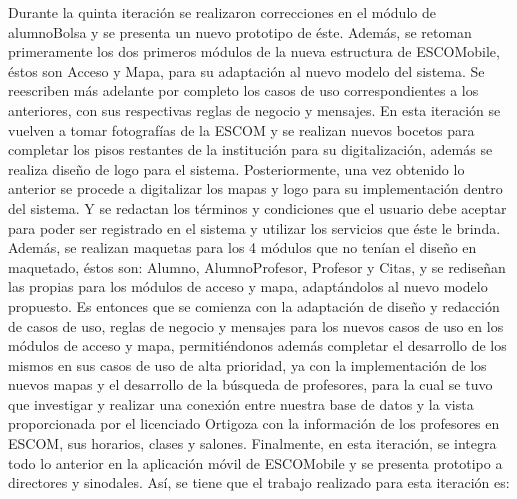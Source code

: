 \noindent
Durante la quinta iteración se realizaron correcciones en el módulo de alumnoBolsa y se presenta un nuevo prototipo de éste. Además, se retoman primeramente los dos primeros módulos de la nueva estructura de ESCOMobile, éstos son Acceso y Mapa, para su adaptación al nuevo modelo del sistema. Se reescriben más adelante por completo los casos de uso correspondientes a los anteriores, con sus respectivas reglas de negocio y mensajes.
\newline
En esta iteración se vuelven a tomar fotografías de la ESCOM y se realizan nuevos bocetos para completar los pisos restantes de la institución para su digitalización, además se realiza diseño de logo para el sistema. Posteriormente, una vez obtenido lo anterior se procede a digitalizar los mapas y logo para su implementación dentro del sistema. Y se redactan los términos y condiciones que el usuario debe aceptar para poder ser registrado en el sistema y utilizar los servicios que éste le brinda. 
\newline
\newline
Además, se realizan maquetas para los 4 módulos que no tenían el diseño en maquetado, éstos son: Alumno, AlumnoProfesor, Profesor y Citas, y se rediseñan las propias para los módulos de acceso y mapa, adaptándolos al nuevo modelo propuesto. 
\newline
Es entonces que se comienza con la adaptación de diseño y redacción de casos de uso, reglas de negocio y mensajes para los nuevos casos de uso en los módulos de acceso y mapa, permitiéndonos además completar el desarrollo de los mismos en sus casos de uso de alta prioridad, ya con la implementación de los nuevos mapas y el desarrollo de la búsqueda de profesores, para la cual se tuvo que investigar y realizar una conexión entre nuestra base de datos y la vista proporcionada por el licenciado Ortigoza con la información de los profesores en ESCOM, sus horarios, clases y salones.
\newline
Finalmente, en esta iteración, se integra todo lo anterior en la aplicación móvil de ESCOMobile y se presenta prototipo a directores y sinodales.
\newline
Así, se tiene que el trabajo realizado para esta iteración es: 

